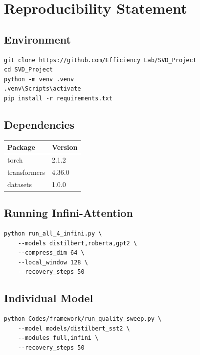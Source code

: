 
\section{Reproducibility Statement}

\subsection{Environment}

\begin{lstlisting}
git clone https://github.com/Efficiency Lab/SVD_Project
cd SVD_Project
python -m venv .venv
.venv\Scripts\activate
pip install -r requirements.txt
\end{lstlisting}

\subsection{Dependencies}

\begin{table}[H]
\centering
\small
\begin{tabular}{ll}
\toprule
\textbf{Package} & \textbf{Version} \\
\midrule
torch & 2.1.2 \\
transformers & 4.36.0 \\
datasets & 1.0.0 \\
\bottomrule
\end{tabular}
\end{table}

\subsection{Running Infini-Attention}

\begin{lstlisting}
python run_all_4_infini.py \
    --models distilbert,roberta,gpt2 \
    --compress_dim 64 \
    --local_window 128 \
    --recovery_steps 50
\end{lstlisting}

\subsection{Individual Model}

\begin{lstlisting}
python Codes/framework/run_quality_sweep.py \
    --model models/distilbert_sst2 \
    --modules full,infini \
    --recovery_steps 50
\end{lstlisting}

